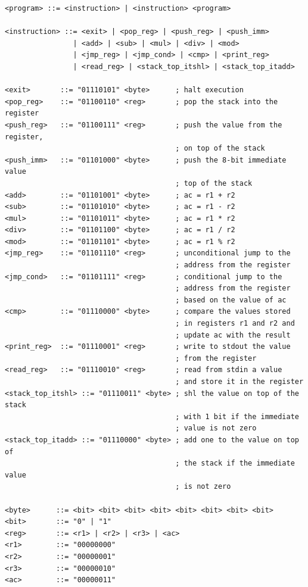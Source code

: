 \begin{lstlisting}[label={lst:vmcastle_bnf}, caption={BNF Grammar of the vmcastle bytecode syntax.}]
<program> ::= <instruction> | <instruction> <program>

<instruction> ::= <exit> | <pop_reg> | <push_reg> | <push_imm>
                | <add> | <sub> | <mul> | <div> | <mod>
                | <jmp_reg> | <jmp_cond> | <cmp> | <print_reg>
                | <read_reg> | <stack_top_itshl> | <stack_top_itadd>

<exit>       ::= "01110101" <byte>      ; halt execution
<pop_reg>    ::= "01100110" <reg>       ; pop the stack into the register
<push_reg>   ::= "01100111" <reg>       ; push the value from the register,
                                        ; on top of the stack
<push_imm>   ::= "01101000" <byte>      ; push the 8-bit immediate value
                                        ; top of the stack
<add>        ::= "01101001" <byte>      ; ac = r1 + r2
<sub>        ::= "01101010" <byte>      ; ac = r1 - r2
<mul>        ::= "01101011" <byte>      ; ac = r1 * r2
<div>        ::= "01101100" <byte>      ; ac = r1 / r2
<mod>        ::= "01101101" <byte>      ; ac = r1 % r2
<jmp_reg>    ::= "01101110" <reg>       ; unconditional jump to the 
                                        ; address from the register
<jmp_cond>   ::= "01101111" <reg>       ; conditional jump to the
                                        ; address from the register
                                        ; based on the value of ac
<cmp>        ::= "01110000" <byte>      ; compare the values stored 
                                        ; in registers r1 and r2 and
                                        ; update ac with the result
<print_reg>  ::= "01110001" <reg>       ; write to stdout the value
                                        ; from the register 
<read_reg>   ::= "01110010" <reg>       ; read from stdin a value 
                                        ; and store it in the register
<stack_top_itshl> ::= "01110011" <byte> ; shl the value on top of the stack
                                        ; with 1 bit if the immediate
                                        ; value is not zero
<stack_top_itadd> ::= "01110000" <byte> ; add one to the value on top of 
                                        ; the stack if the immediate value
                                        ; is not zero

<byte>      ::= <bit> <bit> <bit> <bit> <bit> <bit> <bit> <bit>
<bit>       ::= "0" | "1"
<reg>       ::= <r1> | <r2> | <r3> | <ac>
<r1>        ::= "00000000"
<r2>        ::= "00000001"
<r3>        ::= "00000010"
<ac>        ::= "00000011"
\end{lstlisting}

